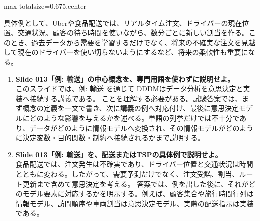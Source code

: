 \begin{adjustbox}{max totalsize={\textwidth}{0.675\textheight},center}
\begin{minipage}{\textwidth}
\begin{minipage}[t]{0.485\textwidth}
具体例として、Uberや食品配送では、リアルタイム注文、ドライバーの現在位置、交通状況、顧客の待ち時間を使いながら、数分ごとに新しい割当を作る。このとき、過去データから需要を学習するだけでなく、将来の不確実な注文を見越して現在のドライバーを使い切らないようにするなど、将来の柔軟性も重要になる。\par
{}
\begin{enumerate}
\item \textbf{Slide 013「例: 輸送」の中心概念を、専門用語を使わずに説明せよ。}\\このスライドでは、例: 輸送 を通じて DDDMはデータ分析を意思決定と実装へ接続する講義である。 ことを理解する必要がある。試験答案では、まず概念の定義を一文で書き、次に講義の例へ対応付け、最後に意思決定モデルにどのような影響を与えるかを述べる。単語の列挙だけでは不十分であり、データがどのように情報モデルへ変換され、その情報モデルがどのように決定変数・目的関数・制約へ接続されるかまで説明する。
\item \textbf{Slide 013「例: 輸送」を、配送またはTSPの具体例で説明せよ。}\\食品配送では、注文発生は不確実であり、ドライバー位置と交通状況は時間とともに変わる。したがって、需要予測だけでなく、注文受諾、割当、ルート更新まで含めて意思決定を考える。 答案では、例を出した後に、それがどのモデル要素に対応するかを明示する。例えば、顧客集合や旅行時間行列は情報モデル、訪問順序や車両割当は意思決定モデル、実際の配送指示は実装である。
\end{enumerate}
\end{minipage}
\end{minipage}
\end{adjustbox}

